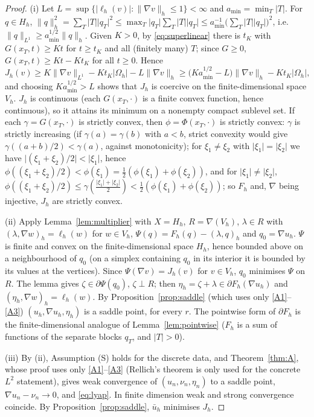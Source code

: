 \documentclass[11pt]{amsart}
\theoremstyle{definition}
\theoremstyle{remark}
\numberwithin{equation}{section}
\newcommand{\abs}[1]{\lvert #1\rvert}
\newcommand{\norm}[1]{\lVert #1\rVert}
\begin{document}
\begin{proof}
(i) Let $L=\sup\{\abs{\ell_h(v)}:\norm{\nabla v}_h\le1\}<\infty$ and $a_{\min}=\min_T\abs T$. For $q\in H_h$, $\norm q_h^2=\sum_T\abs T\abs{q_T}^2\le\max_T\abs{q_T}\sum_T\abs T\abs{q_T}\le a_{\min}^{-1}\big(\sum_T\abs T\abs{q_T}\big)^2$, i.e.\ $\norm q_{L^1}\ge a_{\min}^{1/2}\norm q_h$. Given $K>0$, by \eqref{eq:superlinear} there is $t_K$ with $G(x_T,t)\ge Kt$ for $t\ge t_K$ and all (finitely many) $T$; since $G\ge0$, $G(x_T,t)\ge Kt-Kt_K$ for all $t\ge0$. Hence
\[
J_h(v)\ge K\norm{\nabla v}_{L^1}-Kt_K\abs{\Omega_h}-L\norm{\nabla v}_h\ge\big(Ka_{\min}^{1/2}-L\big)\norm{\nabla v}_h-Kt_K\abs{\Omega_h},
\]
and choosing $K a_{\min}^{1/2}>L$ shows that $J_h$ is coercive on the finite-dimensional space $V_h$. $J_h$ is continuous (each $G(x_T,\cdot)$ is a finite convex function, hence continuous), so it attains its minimum on a nonempty compact sublevel set. If each $\gamma=G(x_T,\cdot)$ is strictly convex, then $\phi=\Phi(x_T,\cdot)$ is strictly convex: $\gamma$ is strictly increasing (if $\gamma(a)=\gamma(b)$ with $a<b$, strict convexity would give $\gamma((a+b)/2)<\gamma(a)$, against monotonicity); for $\xi_1\ne\xi_2$ with $\abs{\xi_1}=\abs{\xi_2}$ we have $\abs{(\xi_1+\xi_2)/2}<\abs{\xi_1}$, hence $\phi((\xi_1+\xi_2)/2)<\phi(\xi_1)=\frac12(\phi(\xi_1)+\phi(\xi_2))$, and for $\abs{\xi_1}\ne\abs{\xi_2}$, $\phi((\xi_1+\xi_2)/2)\le\gamma(\frac{\abs{\xi_1}+\abs{\xi_2}}2)<\frac12(\phi(\xi_1)+\phi(\xi_2))$; so $F_h$ and, $\nabla$ being injective, $J_h$ are strictly convex.

(ii) Apply Lemma~\ref{lem:multiplier} with $X=H_h$, $R=\nabla(V_h)$, $\lambda\in R$ with $(\lambda,\nabla w)_h=\ell_h(w)$ for $w\in V_h$, $\Psi(q)=F_h(q)-(\lambda,q)_h$ and $q_0=\nabla u_h$. $\Psi$ is finite and convex on the finite-dimensional space $H_h$, hence bounded above on a neighbourhood of $q_0$ (on a simplex containing $q_0$ in its interior it is bounded by its values at the vertices). Since $\Psi(\nabla v)=J_h(v)$ for $v\in V_h$, $q_0$ minimises $\Psi$ on $R$. The lemma gives $\zeta\in\partial\Psi(q_0)$, $\zeta\perp R$; then $\eta_h=\zeta+\lambda\in\partial F_h(\nabla u_h)$ and $(\eta_h,\nabla w)_h=\ell_h(w)$. By Proposition~\ref{prop:saddle} (which uses only \ref{A1}--\ref{A3}) $(u_h,\nabla u_h,\eta_h)$ is a saddle point, for every $r$. The pointwise form of $\partial F_h$ is the finite-dimensional analogue of Lemma~\ref{lem:pointwise} ($F_h$ is a sum of functions of the separate blocks $q_T$, and $\abs T>0$).

(iii) By (ii), Assumption (S) holds for the discrete data, and Theorem~\ref{thm:A}, whose proof uses only \ref{A1}--\ref{A3} (Rellich's theorem is only used for the concrete $L^2$ statement), gives weak convergence of $(u_n,\nu_n,\eta_n)$ to a saddle point, $\nabla u_n-\nu_n\to0$, and \eqref{eq:lyap}. In finite dimension weak and strong convergence coincide. By Proposition~\ref{prop:saddle}, $\bar u_h$ minimises $J_h$.
\end{proof}
\end{document}
